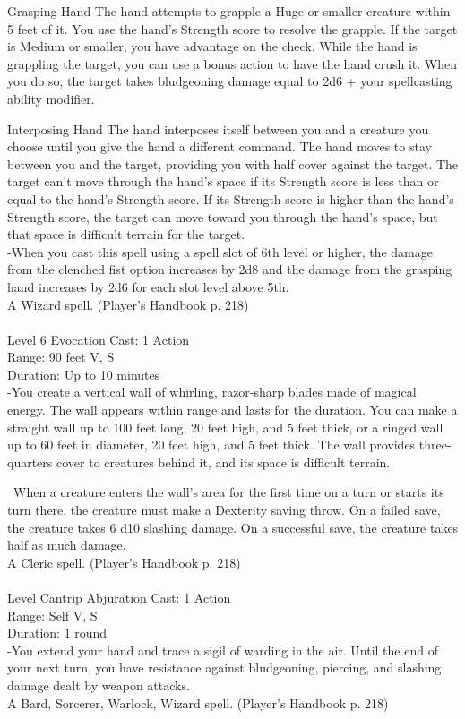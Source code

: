 \documentclass[10pt,twocolumn]{report}
\begin{document}
Grasping Hand
The hand attempts to grapple a Huge or smaller creature within 5 feet of it. You use the hand’s Strength score to resolve the grapple. If the target is Medium or smaller, you have advantage on the check. While the hand is grappling the target, you can use a bonus action to have the hand crush it. When you do so, the target takes bludgeoning damage equal to 2d6 + your spellcasting ability modifier. 

Interposing Hand
The hand interposes itself between you and a creature you choose until you give the hand a different command. The hand moves to stay between you and the target, providing you with half cover against the target. The target can’t move through the hand’s space if its Strength score is less than or equal to the hand’s Strength score. If its Strength score is higher than the hand’s Strength score, the target can move toward you through the hand’s space, but that space is difficult terrain for the target.\\
-When you cast this spell using a spell slot of 6th level or higher, the damage from the clenched fist option increases by 2d8 and the damage from the grasping hand increases by 2d6 for each slot level above 5th.\\
A Wizard spell. (Player's Handbook p. 218) \\


 \\
Level 6 \quad Evocation \quad Cast: 1 Action\\
Range: 90 feet \quad V, S\\
Duration: Up to 10 minutes \quad \\
-You create a vertical wall of whirling, razor-sharp blades made of magical energy. The wall appears within range and lasts for the duration. You can make a straight wall up to 100 feet long, 20 feet high, and 5 feet thick, or a ringed wall up to 60 feet in diameter, 20 feet high, and 5 feet thick. The wall provides three-quarters cover to creatures behind it, and its space is difficult terrain. 

 When a creature enters the wall’s area for the first time on a turn or starts its turn there, the creature must make a Dexterity saving throw. On a failed save, the creature takes 6 d10 slashing damage. On a successful save, the creature takes half as much damage.\\
A Cleric spell. (Player's Handbook p. 218) \\


 \\
Level Cantrip \quad Abjuration \quad Cast: 1 Action\\
Range: Self \quad V, S\\
Duration: 1 round \quad \\
-You extend your hand and trace a sigil of warding in the air. Until the end of your next turn, you have resistance against bludgeoning, piercing, and slashing damage dealt by weapon attacks.\\
A Bard, Sorcerer, Warlock, Wizard spell. (Player's Handbook p. 218) \\
\end{document}

